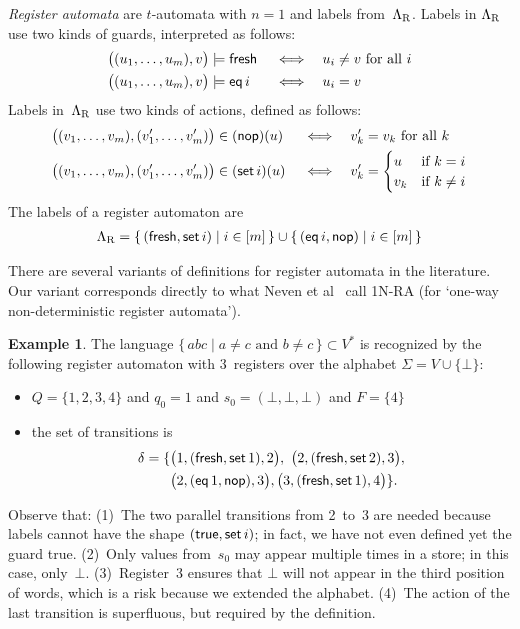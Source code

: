 \documentclass{article} %
\newcommand{\eoe}{\hskip5mm\null\nobreak\hfill\vrule height1ex width1ex}
\theoremstyle{definition}
\newtheorem{example}{Example}
\theoremstyle{remark}
\begin{document}
\emph{Register automata} are $t$-automata with $n=1$ and labels from~$\Lambda_{\rm R}$.
Labels in $\Lambda_{\rm R}$ use two kinds of guards, interpreted as follows:
\begin{align*}
\bigl((u_1,\ldots,u_m),v\bigr)&\models{\sf fresh}
  &&\iff &&\text{$u_i\ne v$ for all $i$} \\
\bigl((u_1,\ldots,u_m),v\bigr)&\models{\sf eq}\,i
  &&\iff &&\text{$u_i=v$}
\end{align*}
Labels in~$\Lambda_{\rm R}$ use two kinds of actions, defined as follows:
\begin{align*}
\bigl((v_1,\ldots,v_m),(v'_1,\ldots,v'_m)\bigr) &\in ({\sf nop})(u)
  &&\iff &&\text{$v'_k=v_k$ for all~$k$} \\
\bigl((v_1,\ldots,v_m),(v'_1,\ldots,v'_m)\bigr) &\in ({\sf set}\,i)(u)
  &&\iff && v'_k=\begin{cases}u&\text{if $k=i$}\\v_k&\text{if $k\ne i$}\end{cases}
\end{align*}
The labels of a register automaton are
\begin{align*}
\Lambda_{\rm R} =
       \{\,({\sf fresh},{\sf set}\,i)\mid i\in[m]\,\}
  \cup \{\,({\sf eq}\,i,{\sf nop})\mid i\in[m]\,\}
\end{align*}

There are several variants of definitions for register automata in the literature.
Our variant corresponds directly to what Neven et al~\cite{dblp:conf/mfcs/nevensv01} call 1N-RA (for `one-way non-deterministic register automata').

\begin{example}\label{ex:ra1}
The language $\{\,abc\mid\text{$a\ne c$ and $b\ne c$}\,\}\subset V^*$ is recognized by the following register automaton with $3$~registers over the alphabet $\Sigma=V\cup\{\bot\}$:
\begin{itemize}
\item $Q=\{1,2,3,4\}$
  and $q_0=1$
  and $s_0=(\bot,\bot,\bot)$
  and $F=\{4\}$
\item the set of transitions is
\begin{align*}\delta =\{ & \bigl(1,({\sf fresh},{\sf set}\,1),2\bigr), \ \bigl(2,({\sf fresh},{\sf set}\,2),3\bigr), \\
& \bigl(2,({\sf eq}\,1,{\sf nop}),3\bigr), \bigl(3,({\sf fresh},{\sf set}\,1),4\bigr) \}.
\end{align*}
\end{itemize}
Observe that:
(1)~The two parallel transitions from 2~to~3 are needed because labels cannot have the shape $({\sf true},{\sf set}\,i)$; in fact, we have not even defined yet the guard {\sf true}.
(2)~Only values from~$s_0$ may appear multiple times in a store; in this case, only~$\bot$.
(3)~Register~3 ensures that $\bot$ will not appear in the third position of words, which is a risk because we extended the alphabet.
(4)~The action of the last transition is superfluous, but required by the definition.
\eoe
\end{example}
\end{document}
